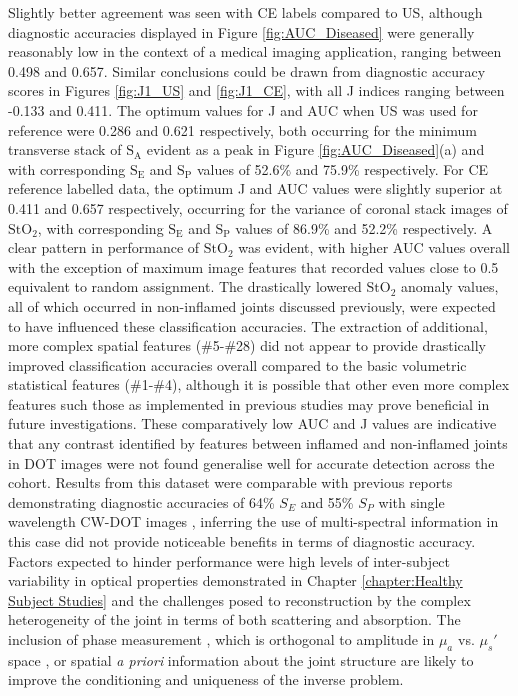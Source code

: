 \documentclass[twoside]{bhamthesis}
\theoremstyle{definition}
\begin{document}
Slightly better agreement was seen with CE labels compared to US, although diagnostic accuracies displayed in Figure \ref{fig:AUC_Diseased} were generally reasonably low in the context of a medical imaging application, ranging between 0.498 and 0.657. Similar conclusions could be drawn from diagnostic accuracy scores in Figures \ref{fig:J1_US} and \ref{fig:J1_CE}, with all J indices ranging between -0.133 and 0.411. The optimum values for J and AUC when US was used for reference were 0.286 and 0.621 respectively, both occurring for the minimum transverse stack of $\mathrm{S_A}$ evident as a peak in Figure \ref{fig:AUC_Diseased}(a) and with corresponding $\mathrm{S_E}$ and $\mathrm{S_P}$ values of 52.6\% and 75.9\% respectively. For CE reference labelled data, the optimum J and AUC values were slightly superior at 0.411 and 0.657 respectively, occurring for the variance of coronal stack images of $\mathrm{StO_2}$, with corresponding $\mathrm{S_E}$ and $\mathrm{S_P}$ values of 86.9\% and 52.2\% respectively. A clear pattern in performance of $\mathrm{StO_2}$ was evident, with higher AUC values overall with the exception of maximum image features that recorded values close to 0.5 equivalent to random assignment. The drastically lowered $\mathrm{StO_2}$ anomaly values, all of which occurred in non-inflamed joints discussed previously, were expected to have influenced these classification accuracies. The extraction of additional, more complex spatial features (\#5-\#28) did not appear to provide drastically improved classification accuracies overall compared to the basic volumetric statistical features (\#1-\#4), although it is possible that other even more complex features such those as implemented in previous studies \cite{montejo2013computer} may prove beneficial in future investigations. These comparatively low AUC and J values are indicative that any contrast identified by features between inflamed and non-inflamed joints in DOT images were not found generalise well for accurate detection across the cohort. Results from this dataset were comparable with previous reports demonstrating diagnostic accuracies of 64\% $S_E$ and 55\% $S_P$ with single wavelength CW-DOT images \cite{hielscher2011frequency}, inferring the use of multi-spectral information in this case did not provide noticeable benefits in terms of diagnostic accuracy. Factors expected to hinder performance were high levels of inter-subject variability in optical properties demonstrated in Chapter 
\ref{chapter:Healthy Subject Studies} and the challenges posed to reconstruction by the complex heterogeneity of the joint in terms of both scattering and absorption. The inclusion of phase measurement \cite{hielscher2011frequency}, which is orthogonal to amplitude in $\mu_a$ vs. $\mu_s'$ space \cite{chu2009image}, or spatial \textit{a priori} information about the joint structure \cite{yuan2010image} are likely to improve the conditioning and uniqueness of the inverse problem. 
 
\end{document}

